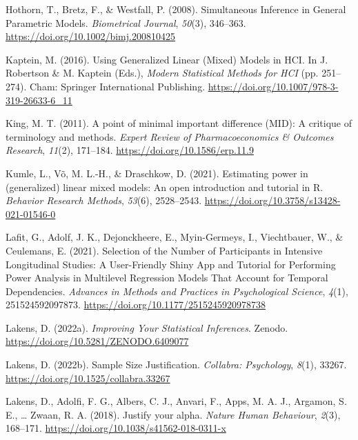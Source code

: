 \documentclass[
  man,floatsintext]{apa6}
\newlength{\cslhangindent}
\newlength{\cslentryspacingunit} %
\newenvironment{CSLReferences}[2] %
 {%
  \setlength{\parindent}{0pt}
  \ifodd #1
  \let\oldpar\par
  \def\par{\hangindent=\cslhangindent\oldpar}
  \fi
  \setlength{\parskip}{#2\cslentryspacingunit}
 }%
 {}
\begin{document}
\begin{CSLReferences}{1}{0}
\leavevmode{}%
Hothorn, T., Bretz, F., \& Westfall, P. (2008). Simultaneous {Inference} in {General Parametric Models}. \emph{Biometrical Journal}, \emph{50}(3), 346--363. \url{https://doi.org/10.1002/bimj.200810425}

\leavevmode{}%
Kaptein, M. (2016). Using {Generalized Linear} ({Mixed}) {Models} in {HCI}. In J. Robertson \& M. Kaptein (Eds.), \emph{Modern {Statistical Methods} for {HCI}} (pp. 251--274). {Cham}: {Springer International Publishing}. \url{https://doi.org/10.1007/978-3-319-26633-6_11}

\leavevmode{}%
King, M. T. (2011). A point of minimal important difference ({MID}): A critique of terminology and methods. \emph{Expert Review of Pharmacoeconomics \& Outcomes Research}, \emph{11}(2), 171--184. \url{https://doi.org/10.1586/erp.11.9}

\leavevmode{}%
Kumle, L., Võ, M. L.-H., \& Draschkow, D. (2021). Estimating power in (generalized) linear mixed models: {An} open introduction and tutorial in {R}. \emph{Behavior Research Methods}, \emph{53}(6), 2528--2543. \url{https://doi.org/10.3758/s13428-021-01546-0}

\leavevmode{}%
Lafit, G., Adolf, J. K., Dejonckheere, E., Myin-Germeys, I., Viechtbauer, W., \& Ceulemans, E. (2021). Selection of the {Number} of {Participants} in {Intensive Longitudinal Studies}: {A User-Friendly Shiny App} and {Tutorial} for {Performing Power Analysis} in {Multilevel Regression Models That Account} for {Temporal Dependencies}. \emph{Advances in Methods and Practices in Psychological Science}, \emph{4}(1), 251524592097873. \url{https://doi.org/10.1177/2515245920978738}

\leavevmode{}%
Lakens, D. (2022a). \emph{Improving {Your Statistical Inferences}}. Zenodo. \url{https://doi.org/10.5281/ZENODO.6409077}

\leavevmode{}%
Lakens, D. (2022b). Sample {Size Justification}. \emph{Collabra: Psychology}, \emph{8}(1), 33267. \url{https://doi.org/10.1525/collabra.33267}

\leavevmode{}%
Lakens, D., Adolfi, F. G., Albers, C. J., Anvari, F., Apps, M. A. J., Argamon, S. E., \ldots{} Zwaan, R. A. (2018). Justify your alpha. \emph{Nature Human Behaviour}, \emph{2}(3), 168--171. \url{https://doi.org/10.1038/s41562-018-0311-x}


\end{CSLReferences}
\end{document}
